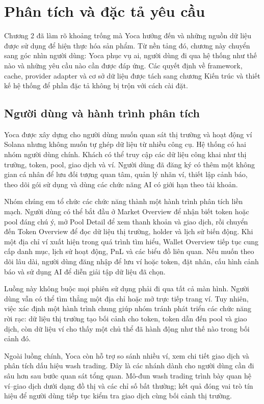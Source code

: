 \chapter{Phân tích và đặc tả yêu cầu}
\label{Chapter3}

Chương 2 đã làm rõ khoảng trống mà Yoca hướng đến và những nguồn dữ liệu được sử dụng để hiện thực hóa sản phẩm. Từ nền tảng đó, chương này chuyển sang góc nhìn người dùng: Yoca phục vụ ai, người dùng đi qua hệ thống như thế nào và những yêu cầu nào cần được đáp ứng. Các quyết định về framework, cache, provider adapter và cơ sở dữ liệu được tách sang chương Kiến trúc và thiết kế hệ thống để phần đặc tả không bị trộn với cách cài đặt.

\section{Người dùng và hành trình phân tích}
\label{sec:yoca_user_journey}

Yoca được xây dựng cho người dùng muốn quan sát thị trường và hoạt động ví Solana nhưng không muốn tự ghép dữ liệu từ nhiều công cụ. Hệ thống có hai nhóm người dùng chính. Khách có thể truy cập các dữ liệu công khai như thị trường, token, pool, giao dịch và ví. Người dùng đã đăng ký có thêm một không gian cá nhân để lưu đối tượng quan tâm, quản lý nhãn ví, thiết lập cảnh báo, theo dõi gói sử dụng và dùng các chức năng AI có giới hạn theo tài khoản.

Nhóm chúng em tổ chức các chức năng thành một hành trình phân tích liền mạch. Người dùng có thể bắt đầu ở Market Overview để nhận biết token hoặc pool đáng chú ý, mở Pool Detail để xem thanh khoản và giao dịch, rồi chuyển đến Token Overview để đọc dữ liệu thị trường, holder và lịch sử biến động. Khi một địa chỉ ví xuất hiện trong quá trình tìm hiểu, Wallet Overview tiếp tục cung cấp danh mục, lịch sử hoạt động, PnL và các biểu đồ liên quan. Nếu muốn theo dõi lâu dài, người dùng đăng nhập để lưu ví hoặc token, đặt nhãn, cấu hình cảnh báo và sử dụng AI để diễn giải tập dữ liệu đã chọn.

Luồng này không buộc mọi phiên sử dụng phải đi qua tất cả màn hình. Người dùng vẫn có thể tìm thẳng một địa chỉ hoặc mở trực tiếp trang ví. Tuy nhiên, việc xác định một hành trình chung giúp nhóm tránh phát triển các chức năng rời rạc: dữ liệu thị trường tạo bối cảnh cho token, token dẫn đến pool và giao dịch, còn dữ liệu ví cho thấy một chủ thể đã hành động như thế nào trong bối cảnh đó.

Ngoài luồng chính, Yoca còn hỗ trợ so sánh nhiều ví, xem chi tiết giao dịch và phân tích dấu hiệu wash trading. Đây là các nhánh dành cho người dùng cần đi sâu hơn sau bước quan sát tổng quan. Mô-đun wash trading trình bày quan hệ ví--giao dịch dưới dạng đồ thị và các chỉ số bất thường; kết quả đóng vai trò tín hiệu để người dùng tiếp tục kiểm tra giao dịch cùng bối cảnh thị trường.

